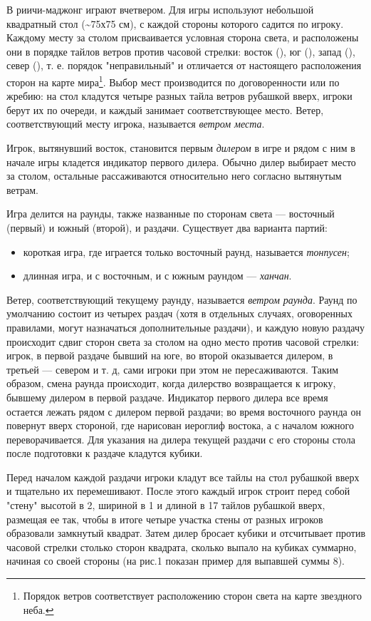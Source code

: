 В риичи-маджонг играют вчетвером. Для игры используют небольшой квадратный стол (\sim75х75 см), с каждой стороны которого садится по игроку. Каждому месту за столом присваивается условная сторона света, и расположены они в порядке тайлов ветров против часовой стрелки: восток (), юг (), запад (), север (), т. е. порядок "неправильный" и отличается от настоящего расположения сторон на карте мира\footnote{Порядок ветров соответствует расположению сторон света на карте звездного неба.}. Выбор мест производится по договоренности или по жребию: на стол кладутся четыре разных тайла ветров рубашкой вверх, игроки берут их по очереди, и каждый занимает соответствующее место. Ветер, соответствующий месту игрока, называется \textit{ветром места}. 

Игрок, вытянувший восток, становится первым \textit{дилером} в игре и рядом с ним в начале игры кладется индикатор первого дилера. Обычно дилер выбирает место за столом, остальные рассаживаются относительно него согласно вытянутым ветрам.

Игра делится на раунды, также названные по сторонам света --- восточный (первый) и южный (второй), и раздачи. Существует два варианта партий:
\begin{itemize}
	\item короткая игра, где играется только восточный раунд, называется \textit{тонпусен};
	\item длинная игра, и с восточным, и с южным раундом --- \textit{ханчан}.
\end{itemize}
Ветер, соответствующий текущему раунду, называется \textit{ветром раунда}. Раунд по умолчанию состоит из четырех раздач (хотя в отдельных случаях, оговоренных правилами, могут назначаться дополнительные раздачи), и каждую новую раздачу происходит сдвиг сторон света за столом на одно место против часовой стрелки: игрок, в первой раздаче бывший на юге, во второй оказывается дилером, в третьей --- севером и т. д, сами игроки при этом не пересаживаются. Таким образом, смена раунда происходит, когда дилерство возвращается к игроку, бывшему дилером в первой раздаче. Индикатор первого дилера все время остается лежать рядом с дилером первой раздачи; во время восточного раунда он повернут вверх стороной, где нарисован иероглиф востока, а с началом южного переворачивается. Для указания на дилера текущей раздачи с его стороны стола после подготовки к раздаче кладутся кубики.

Перед началом каждой раздачи игроки кладут все тайлы на стол рубашкой вверх и тщательно их перемешивают. После этого каждый игрок строит перед собой "стену" высотой в 2, шириной в 1 и длиной в 17 тайлов рубашкой вверх, размещая ее так, чтобы в итоге четыре участка стены от разных игроков образовали замкнутый квадрат. Затем дилер бросает кубики и отсчитывает против часовой стрелки столько сторон квадрата, сколько выпало на кубиках суммарно, начиная со своей стороны (на рис.1 показан пример для выпавшей суммы 8).


